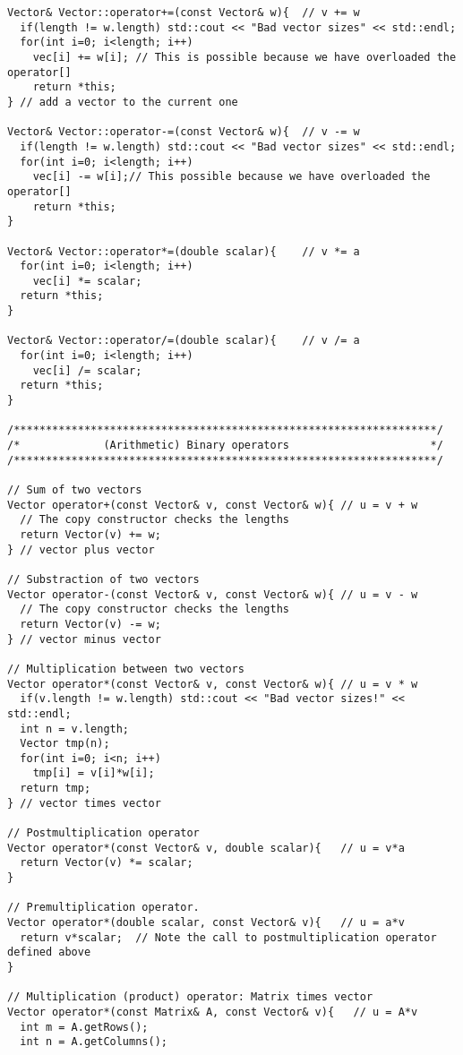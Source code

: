 \begin{lstlisting}[title={\url{http://folk.uio.no/mhjensen/compphys/programs/chapter03/cpp/Vector.cpp}}]
Vector& Vector::operator+=(const Vector& w){  // v += w
  if(length != w.length) std::cout << "Bad vector sizes" << std::endl;
  for(int i=0; i<length; i++)
    vec[i] += w[i]; // This is possible because we have overloaded the operator[]
    return *this;
} // add a vector to the current one

Vector& Vector::operator-=(const Vector& w){  // v -= w
  if(length != w.length) std::cout << "Bad vector sizes" << std::endl;
  for(int i=0; i<length; i++)
    vec[i] -= w[i];// This possible because we have overloaded the operator[]
    return *this;
}

Vector& Vector::operator*=(double scalar){    // v *= a
  for(int i=0; i<length; i++)
    vec[i] *= scalar;
  return *this;
}

Vector& Vector::operator/=(double scalar){    // v /= a
  for(int i=0; i<length; i++)
    vec[i] /= scalar;
  return *this;
}

/******************************************************************/
/*             (Arithmetic) Binary operators                      */
/******************************************************************/

// Sum of two vectors
Vector operator+(const Vector& v, const Vector& w){ // u = v + w
  // The copy constructor checks the lengths
  return Vector(v) += w;
} // vector plus vector

// Substraction of two vectors
Vector operator-(const Vector& v, const Vector& w){ // u = v - w
  // The copy constructor checks the lengths
  return Vector(v) -= w;
} // vector minus vector

// Multiplication between two vectors
Vector operator*(const Vector& v, const Vector& w){ // u = v * w
  if(v.length != w.length) std::cout << "Bad vector sizes!" << std::endl;
  int n = v.length;
  Vector tmp(n);
  for(int i=0; i<n; i++)
    tmp[i] = v[i]*w[i];
  return tmp;  
} // vector times vector

// Postmultiplication operator
Vector operator*(const Vector& v, double scalar){   // u = v*a
  return Vector(v) *= scalar;
}

// Premultiplication operator. 
Vector operator*(double scalar, const Vector& v){   // u = a*v
  return v*scalar;  // Note the call to postmultiplication operator defined above
}

// Multiplication (product) operator: Matrix times vector
Vector operator*(const Matrix& A, const Vector& v){   // u = A*v
  int m = A.getRows();
  int n = A.getColumns();


\end{lstlisting}
